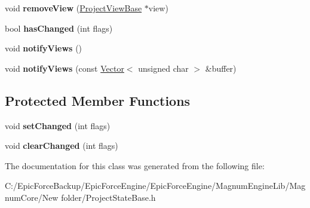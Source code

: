 \begin{DoxyCompactItemize}
\item 
void {\bfseries remove\+View} (\hyperlink{class_epic_force_1_1_project_view_base}{Project\+View\+Base} $\ast$view)\hypertarget{class_epic_force_1_1_project_model_base_a9a97651d8ceb4e1b0532feadbd796bd2}{}\label{class_epic_force_1_1_project_model_base_a9a97651d8ceb4e1b0532feadbd796bd2}

\item 
bool {\bfseries has\+Changed} (int flags)\hypertarget{class_epic_force_1_1_project_model_base_a73b1a57bfa26e5ea47408f19538dc5fa}{}\label{class_epic_force_1_1_project_model_base_a73b1a57bfa26e5ea47408f19538dc5fa}

\item 
void {\bfseries notify\+Views} ()\hypertarget{class_epic_force_1_1_project_model_base_ad84724bbf7f32c55f0bd32f184b3547f}{}\label{class_epic_force_1_1_project_model_base_ad84724bbf7f32c55f0bd32f184b3547f}

\item 
void {\bfseries notify\+Views} (const \hyperlink{class_magnum_1_1_vector}{Vector}$<$ unsigned char $>$ \&buffer)\hypertarget{class_epic_force_1_1_project_model_base_a0ba123ac1a14c1fb89cfd7be0e028ff6}{}\label{class_epic_force_1_1_project_model_base_a0ba123ac1a14c1fb89cfd7be0e028ff6}

\end{DoxyCompactItemize}
\subsection*{Protected Member Functions}
\begin{DoxyCompactItemize}
\item 
void {\bfseries set\+Changed} (int flags)\hypertarget{class_epic_force_1_1_project_model_base_a49b161d9dcbfb5b76f03f03473ab6236}{}\label{class_epic_force_1_1_project_model_base_a49b161d9dcbfb5b76f03f03473ab6236}

\item 
void {\bfseries clear\+Changed} (int flags)\hypertarget{class_epic_force_1_1_project_model_base_ae3ad2698fdcab8b7a54d2ae9e357ca01}{}\label{class_epic_force_1_1_project_model_base_ae3ad2698fdcab8b7a54d2ae9e357ca01}

\end{DoxyCompactItemize}


The documentation for this class was generated from the following file\+:\begin{DoxyCompactItemize}
\item 
C\+:/\+Epic\+Force\+Backup/\+Epic\+Force\+Engine/\+Epic\+Force\+Engine/\+Magnum\+Engine\+Lib/\+Magnum\+Core/\+New folder/Project\+State\+Base.\+h\end{DoxyCompactItemize}
